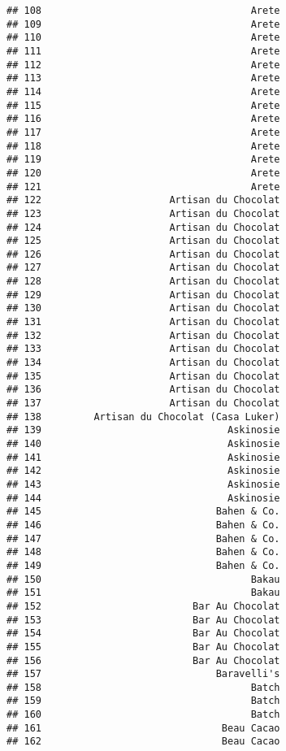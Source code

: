 \documentclass[
]{article}
\begin{document}
\begin{verbatim}
## 108                                    Arete
## 109                                    Arete
## 110                                    Arete
## 111                                    Arete
## 112                                    Arete
## 113                                    Arete
## 114                                    Arete
## 115                                    Arete
## 116                                    Arete
## 117                                    Arete
## 118                                    Arete
## 119                                    Arete
## 120                                    Arete
## 121                                    Arete
## 122                      Artisan du Chocolat
## 123                      Artisan du Chocolat
## 124                      Artisan du Chocolat
## 125                      Artisan du Chocolat
## 126                      Artisan du Chocolat
## 127                      Artisan du Chocolat
## 128                      Artisan du Chocolat
## 129                      Artisan du Chocolat
## 130                      Artisan du Chocolat
## 131                      Artisan du Chocolat
## 132                      Artisan du Chocolat
## 133                      Artisan du Chocolat
## 134                      Artisan du Chocolat
## 135                      Artisan du Chocolat
## 136                      Artisan du Chocolat
## 137                      Artisan du Chocolat
## 138         Artisan du Chocolat (Casa Luker)
## 139                                Askinosie
## 140                                Askinosie
## 141                                Askinosie
## 142                                Askinosie
## 143                                Askinosie
## 144                                Askinosie
## 145                              Bahen & Co.
## 146                              Bahen & Co.
## 147                              Bahen & Co.
## 148                              Bahen & Co.
## 149                              Bahen & Co.
## 150                                    Bakau
## 151                                    Bakau
## 152                          Bar Au Chocolat
## 153                          Bar Au Chocolat
## 154                          Bar Au Chocolat
## 155                          Bar Au Chocolat
## 156                          Bar Au Chocolat
## 157                              Baravelli's
## 158                                    Batch
## 159                                    Batch
## 160                                    Batch
## 161                               Beau Cacao
## 162                               Beau Cacao

\end{verbatim}
\end{document}
